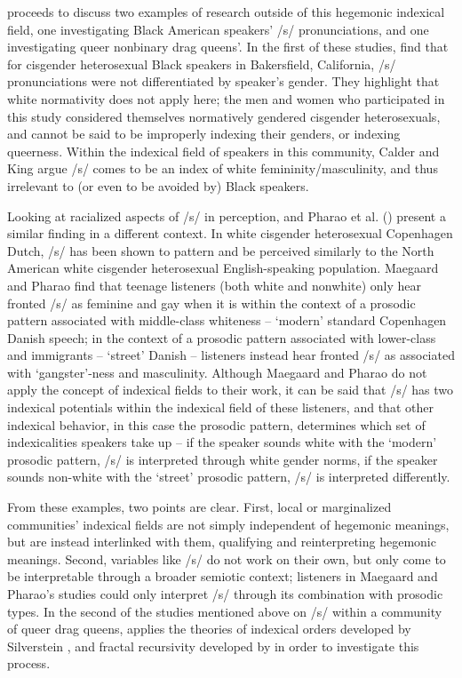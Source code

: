 \documentclass[12pt,twoside]{reedthesis}
\begin{document}
\textcite{calder_whose_2021} proceeds to discuss two examples of research outside of this hegemonic indexical field, one investigating Black American speakers' /s/ pronunciations, and one investigating queer nonbinary drag queens'. In the first of these studies, \textcite{calder_whose_2022} find that for cisgender heterosexual Black speakers in Bakersfield, California, /s/ pronunciations were not differentiated by speaker's gender. They highlight that white normativity does not apply here; the men and women who participated in this study considered themselves normatively gendered cisgender heterosexuals, and cannot be said to be improperly indexing their genders, or indexing queerness. Within the indexical field of speakers in this community, Calder and King argue /s/ comes to be an index of white femininity/masculinity, and thus irrelevant to (or even to be avoided by) Black speakers.

Looking at racialized aspects of /s/ in perception, \textcite{maegaard_s_2015} and Pharao et al. (\cite*{pharao_indexical_2014}) present a similar finding in a different context. In white cisgender heterosexual Copenhagen Dutch, /s/ has been shown to pattern and be perceived similarly to the North American white cisgender heterosexual English-speaking population. Maegaard and Pharao find that teenage listeners (both white and nonwhite) only hear fronted /s/ as feminine and gay when it is within the context of a prosodic pattern associated with middle-class whiteness -- `modern' standard Copenhagen Danish speech; in the context of a prosodic pattern associated with lower-class and immigrants -- `street' Danish -- listeners instead hear fronted /s/ as associated with `gangster'-ness and masculinity. Although Maegaard and Pharao do not apply the concept of indexical fields to their work, it can be said that /s/ has two indexical potentials within the indexical field of these listeners, and that other indexical behavior, in this case the prosodic pattern, determines which set of indexicalities speakers take up -- if the speaker sounds white with the `modern' prosodic pattern, /s/ is interpreted through white gender norms, if the speaker sounds non-white with the `street' prosodic pattern, /s/ is interpreted differently.

From these examples, two points are clear. First, local or marginalized communities' indexical fields are not simply independent of hegemonic meanings, but are instead interlinked with them, qualifying and reinterpreting hegemonic meanings. Second, variables like /s/ do not work on their own, but only come to be interpretable through a broader semiotic context; listeners in Maegaard and Pharao's studies could only interpret /s/ through its combination with prosodic types. In the second of the studies mentioned above on /s/ within a community of queer drag queens, \textcite{calder_sissy_2019} applies the theories of indexical orders developed by Silverstein \parencite*{silverstein_language_2023, silverstein_indexical_2003}, and fractal recursivity developed by \textcite{irvine_language_2000, gal_boundaries_1995} in order to investigate this process.
\end{document}
